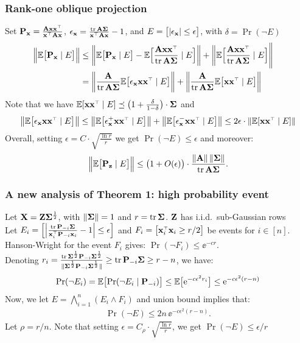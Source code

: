 \documentclass[10pt]{beamer}
\begin{document}
  \begin{frame}
    \frametitle{Rank-one oblique projection}
Set $\P_\x=\frac{\A\x\x^\top}{\x^\top\A\x}$,
$\epsilon_\x=\frac{\tr\,\A\Sigmab}{\x^\top\A\x}-1$, and
$E=\big[|\epsilon_\mathbf x|\leq \epsilon\big]$, with $\delta=\Pr(\neg E)$
    \begin{align*}
\hspace{-4mm}\Big\|\E\big[\P_\x\mid E\big]\Big\|
&\leq\bigg\|\E\big[\P_\x\mid E\big] -
        \E\Big[\frac{\A\x\x^\top}{\tr\,\A\Sigmab}\mid E\Big]\bigg\|
        + \bigg\|\E\Big[\frac{\A\x\x^\top}{\tr\,\A\Sigmab}\mid E\Big]\Bigg\|\\
      &=\bigg\|\frac{\A}{\tr\,\A\Sigmab}
        \E\big[\epsilon_\x\x\x^\top\mid E\big]\bigg\|
        +\bigg\|\frac{\A}{\tr\,\A\Sigmab}\E\big[\x\x^\top\mid E\big]\bigg\|
    \end{align*}
    Note that we have $\E[\x\x^\top\mid E]\preceq \big(1+
    \frac{\delta}{1-\delta}\big)\cdot\Sigmab$ and
    \begin{align*}
      \big\|\E\big[\epsilon_\x\x\x^\top\mid E\big]\big\| \leq
      \big\|\E\big[\epsilon_\x^+\x\x^\top\mid E\big]\big\|+
      \big\|\E\big[\epsilon_\x^-\x\x^\top\mid E\big]\big\|\leq
      2\epsilon\cdot \|\E[\x\x^\top\mid E]\|
    \end{align*}
    Overall, setting $\epsilon=C\cdot \sqrt{\frac{\ln r}{r}}$ we get
    $\Pr(\neg E)\leq \epsilon$ and moreover:
    \begin{align*}
      \Big\|\mathbb E\big[\mathbf P_\mathbf z\mid E\big]\Big\|\leq
      \big(1+O(\epsilon)\big)\cdot\frac{\|\mathbf A\|\,\|\mathbf{\Sigma}\|}{\mathrm{tr}\,\mathbf A\mathbf{\Sigma}}.
      \end{align*}
  \end{frame}


  \begin{frame}
    \frametitle{A new analysis of Theorem 1: high probability event}
Let $\mathbf X = \mathbf Z\mathbf{\Sigma}^{\frac12}$, with $\|\mathbf{\Sigma}\|=1$ and
$r=\mathrm{tr}\,\mathbf{\Sigma}$. $\mathbf Z$ has i.i.d.~sub-Gaussian rows\\
    Let $E_i =
    \Big[\Big|\frac{\tr\,\P_{-i}\Sigmab}{\x_i^\top\P_{-i}\x_i}-1\Big|\leq
\epsilon\Big]$ and $F_i= \big[\x_i^\top\x_i\geq r/2\big]$ be
    events for $i\in[n]$.\\
    Hanson-Wright for the event $F_i$ gives: $\Pr(\neg F_i)\leq
    \ee^{-c r}$.\\
Denoting
$r_i=\frac{\mathrm{tr}\,\mathbf{\Sigma}^{\frac12}\mathbf P_{-i}\mathbf{\Sigma}^{\frac12}}{\|\mathbf{\Sigma}^{\frac12}\mathbf P_{-i}\mathbf{\Sigma}^{\frac12}\|}\geq
\mathrm{tr}\,\mathbf P_{-i}\mathbf{\Sigma}\geq r-n$, 
we have:
\begin{align*}
\mathrm{Pr}(\neg E_i) = \mathbb E\big[\mathrm{Pr}(\neg E_i\mid \mathbf P_{-i})\big]\leq
  \mathbb E\big[\mathrm{e}^{-c\epsilon^2r_i}\big]\leq \mathrm{e}^{-c\epsilon^2(r-n)}
\end{align*}
Now, we let $E = \bigwedge_{i=1}^n(E_i \wedge F_i)$ and union bound
implies that:
\begin{align*}
  \Pr(\neg E)\leq 2n\,\ee^{-c\epsilon^2(r-n)}.
\end{align*}
Let $\rho = r/n$. Note that setting $\epsilon = C_\rho\cdot
\sqrt{\frac{\ln r}{r}}$, we get $\Pr(\neg E)\leq \epsilon/r$
  \end{frame}
  
\end{document}
